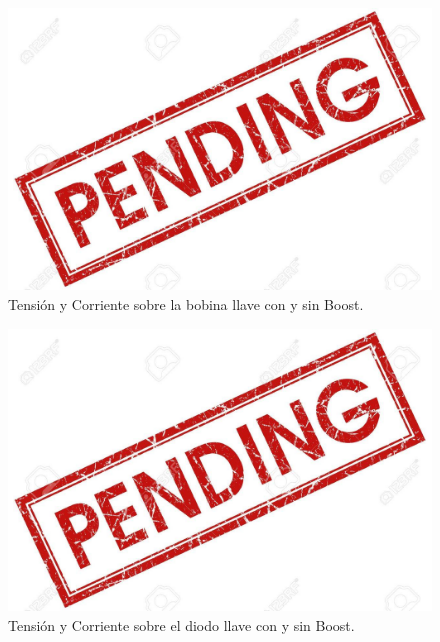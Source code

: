 \begin{multicols}{2}
\begin{figure}[H]
	\centering
	\includegraphics[width=0.9\linewidth]{ImagenesEjercicio-3/pend}
	\caption{Tensión y Corriente sobre la bobina llave con y sin Boost.}
	\label{fig:ej3:Il_Vl_SWITCH_BOOST}
\end{figure}
\begin{figure}[H]
	\centering
	\includegraphics[width=0.9\linewidth]{ImagenesEjercicio-3/pend}
	\caption{Tensión y Corriente sobre el diodo llave con y sin Boost.}
	\label{fig:ej3:Id_Vd_SWITCH_BOOST}
\end{figure}
\end{multicols}

